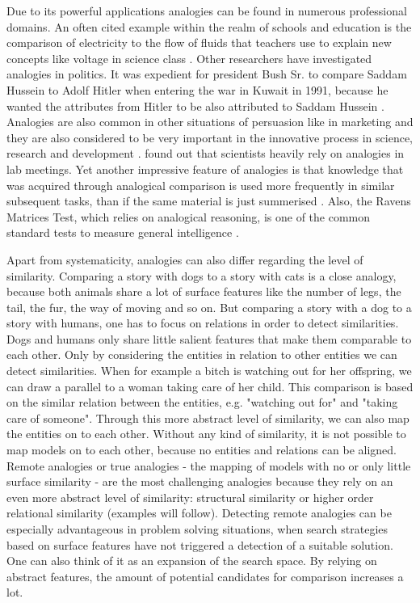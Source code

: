\documentclass[a4paper,man,natbib,floatsintext,import]{apa6}
\begin{document}
Due to its powerful applications analogies can be found in numerous professional domains. An often cited example within the realm of schools and education is the comparison of electricity to the flow of fluids that teachers use to explain new concepts like voltage in science class \citep{Treagust1992,Dupin1989,Gentner1982}. Other researchers have investigated analogies in politics. It was expedient for president Bush Sr. to compare Saddam Hussein to Adolf Hitler when entering the war in Kuwait in 1991, because he wanted the attributes from Hitler to be also attributed to Saddam Hussein \citep{MacDonald2002}. Analogies are also common in other situations of persuasion like in marketing \citep{Herzenstein2014,Cornelissen2003} and they are also considered to be very important in the innovative process in science, research and development \citep{Gentner2002}. \cite{Dunbar2001} found out that scientists heavily rely on analogies in lab meetings. Yet another impressive feature of analogies is that knowledge that was acquired through analogical comparison is used more frequently in similar subsequent tasks, than if the same material is just summerised \citep{Gentner2003a,Loewenstein1999}. Also, the Ravens Matrices Test, which relies on analogical reasoning, is one of the common standard tests to measure general intelligence \citep{Carpenter1990}.

Apart from systematicity, analogies can also differ regarding the level of similarity. Comparing a story with dogs to a story with cats is a close analogy, because both animals share a lot of surface features like the number of legs, the tail, the fur, the way of moving and so on. But comparing a story with a dog to a story with humans, one has to focus on relations in order to detect similarities. Dogs and humans only share little salient features that make them comparable to each other. Only by considering the entities in relation to other entities we can detect similarities. When for example a bitch is watching out for her offspring, we can draw a parallel to a woman taking care of her child. This comparison is based on the similar relation between the entities, e.g. "watching out for" and "taking care of someone". Through this more abstract level of similarity, we can also map the entities on to each other. Without any kind of similarity, it is not possible to map models on to each other, because no entities and relations can be aligned.
Remote analogies or true analogies \citep{Wharton1996} - the mapping of models with no or only little surface similarity - are the most challenging analogies because they rely on an even more abstract level of similarity: structural similarity or higher order relational similarity \citep{Catrambone2002} (examples will follow). Detecting remote analogies can be especially advantageous in problem solving situations, when search strategies based on surface features have not triggered a detection of a suitable solution. One can also think of it as an expansion of the search space. By relying on abstract features, the amount of potential candidates for comparison increases a lot.
\end{document}
